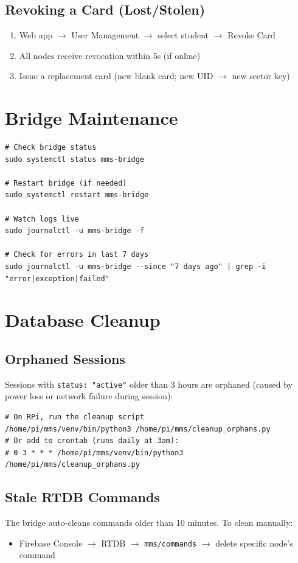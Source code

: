 \subsection{Revoking a Card (Lost/Stolen)}
\begin{enumerate}[leftmargin=1.5em]
    \item Web app $\rightarrow$ User Management $\rightarrow$ select student $\rightarrow$ Revoke Card
    \item All nodes receive revocation within 5s (if online)
    \item Issue a replacement card (new blank card; new UID $\rightarrow$ new sector key)
\end{enumerate}

\section{Bridge Maintenance}

\begin{lstlisting}[style=bashstyle]
# Check bridge status
sudo systemctl status mms-bridge

# Restart bridge (if needed)
sudo systemctl restart mms-bridge

# Watch logs live
sudo journalctl -u mms-bridge -f

# Check for errors in last 7 days
sudo journalctl -u mms-bridge --since "7 days ago" | grep -i "error|exception|failed"
\end{lstlisting}

\section{Database Cleanup}

\subsection{Orphaned Sessions}

Sessions with \texttt{status: "active"} older than 3 hours are orphaned (caused by power loss or network failure during session):

\begin{lstlisting}[style=bashstyle]
# On RPi, run the cleanup script
/home/pi/mms/venv/bin/python3 /home/pi/mms/cleanup_orphans.py
# Or add to crontab (runs daily at 3am):
# 0 3 * * * /home/pi/mms/venv/bin/python3 /home/pi/mms/cleanup_orphans.py
\end{lstlisting}

\subsection{Stale RTDB Commands}

The bridge auto-cleans commands older than 10 minutes. To clean manually:
\begin{itemize}[leftmargin=1.5em]
    \item Firebase Console $\rightarrow$ RTDB $\rightarrow$ \texttt{mms/commands} $\rightarrow$ delete specific node's command
\end{itemize}
